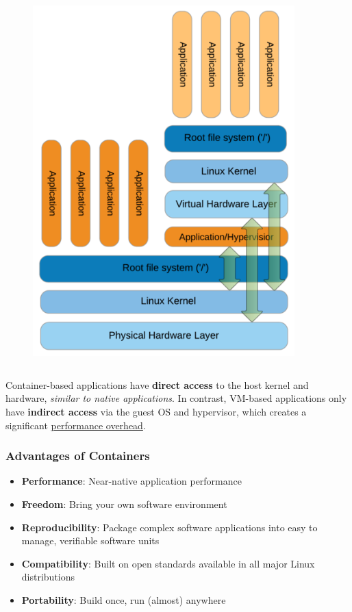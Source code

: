 \documentclass{beamer}
\begin{document}
\begin{frame}
\begin{columns}
\begin{column}{0.5\textwidth}
\begin{figure}[htbp]
            \includegraphics[width=0.9\textwidth]{images/singularity-virtual-machine-architecture.png}
         \end{figure}
      \end{column}
   \end{columns}
   \vspace{1.0em}
   Container-based applications have \textbf{direct access} to the host
   kernel and hardware, \textit{similar to native applications}. In 
   contrast, VM-based applications only have \textbf{indirect access} 
   via the guest OS and hypervisor, which creates a significant 
   \underline{performance overhead}.
\end{frame}

\begin{frame}
   \frametitle{Advantages of Containers}
   \begin{itemize}
      \setlength\itemsep{1.0em}
      \item \textbf{Performance}: Near-native application performance
      \item \textbf{Freedom}: Bring your own software environment
      \item \textbf{Reproducibility}: Package complex software 
         applications into easy to manage, verifiable software units
      \item \textbf{Compatibility}: Built on open standards available in 
         all major Linux distributions
      \item \textbf{Portability}: Build once, run (almost) anywhere 
   \end{itemize}
\end{frame}
\end{document}
